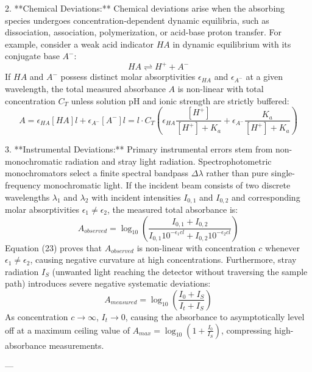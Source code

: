 \documentclass[12pt]{article}
\begin{document}
2. **Chemical Deviations:** Chemical deviations arise when the absorbing species undergoes concentration-dependent dynamic equilibria, such as dissociation, association, polymerization, or acid-base proton transfer. For example, consider a weak acid indicator $HA$ in dynamic equilibrium with its conjugate base $A^-$:
\begin{equation}
HA \rightleftharpoons H^+ + A^-
\end{equation}
If $HA$ and $A^-$ possess distinct molar absorptivities $\epsilon_{HA}$ and $\epsilon_{A^-}$ at a given wavelength, the total measured absorbance $A$ is non-linear with total concentration $C_T$ unless solution $\text{pH}$ and ionic strength are strictly buffered:
\begin{equation}
A = \epsilon_{HA} [HA] l + \epsilon_{A^-} [A^-] l = l \cdot C_T \left( \epsilon_{HA} \frac{[H^+]}{[H^+] + K_a} + \epsilon_{A^-} \frac{K_a}{[H^+] + K_a} \right)
\end{equation}

3. **Instrumental Deviations:** Primary instrumental errors stem from non-monochromatic radiation and stray light radiation. Spectrophotometric monochromators select a finite spectral bandpass $\Delta \lambda$ rather than pure single-frequency monochromatic light. If the incident beam consists of two discrete wavelengths $\lambda_1$ and $\lambda_2$ with incident intensities $I_{0,1}$ and $I_{0,2}$ and corresponding molar absorptivities $\epsilon_1 \neq \epsilon_2$, the measured total absorbance is:
\begin{equation}
A_{observed} = \log_{10} \left( \frac{I_{0,1} + I_{0,2}}{I_{0,1} 10^{-\epsilon_1 c l} + I_{0,2} 10^{-\epsilon_2 c l}} \right)
\end{equation}
Equation (23) proves that $A_{observed}$ is non-linear with concentration $c$ whenever $\epsilon_1 \neq \epsilon_2$, causing negative curvature at high concentrations. Furthermore, stray radiation $I_S$ (unwanted light reaching the detector without traversing the sample path) introduces severe negative systematic deviations:
\begin{equation}
A_{measured} = \log_{10} \left( \frac{I_0 + I_S}{I_t + I_S} \right)
\end{equation}
As concentration $c \rightarrow \infty$, $I_t \rightarrow 0$, causing the absorbance to asymptotically level off at a maximum ceiling value of $A_{max} = \log_{10} \left( 1 + \frac{I_0}{I_S} \right)$, compressing high-absorbance measurements.

---
\end{document}
